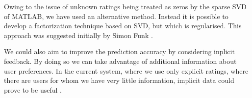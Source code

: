 Owing to the issue of unknown ratings being treated as zeros by the sparse SVD
of MATLAB, we have used an
alternative method. Instead it is possible to develop a factorization technique
based on SVD, but which is regularised. This approach was suggested initially by
Simon Funk \cite{Paterek_RegSVD}.

We could also aim to improve the prediction accuracy by considering inplicit
feedback. By doing so we can take advantage of additional information about user
preferences. In the current system, where we use only explicit ratings, where
there are users for whom we have very little information, implicit data could
prove to be useful \cite{citeulike:8923836}.








